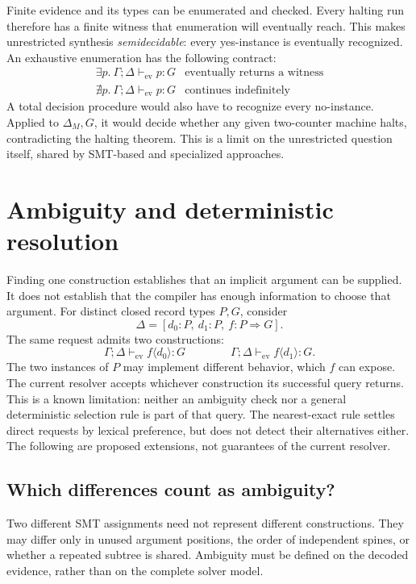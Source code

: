 \documentclass[10pt,a4paper]{article}
\newcommand{\Pj}[2]{\Gamma;\Delta\vdash_{\mathrm{ev}} #1:#2}
\newcommand{\iarg}[1]{\langle#1\rangle}
\begin{document}
Finite evidence and its types can be enumerated and checked. Every halting run
therefore has a finite witness that enumeration will eventually reach. This makes
unrestricted synthesis \emph{semidecidable}: every yes-instance is eventually
recognized. An exhaustive enumeration has the following contract:
\[
\begin{array}{c|c}
 \exists p.\ \Pj p G & \text{eventually returns a witness}\\[3pt]
 \nexists p.\ \Pj p G & \text{continues indefinitely}
\end{array}
\]
A total decision procedure would also have to recognize every no-instance.
Applied to $\Delta_M,G$, it would decide whether any given two-counter machine
halts, contradicting the halting theorem. This is a limit on the unrestricted
question itself, shared by SMT-based and specialized approaches.


\newpage
\section{Ambiguity and deterministic resolution}
\label{sec:ambiguity}
Finding one construction establishes that an implicit argument can be supplied.
It does not establish that the compiler has enough information to choose that
argument. For distinct closed record types $P,G$, consider
\[
 \Delta=[d_0:P,\ d_1:P,\ f:P\Rightarrow G].
\]
The same request admits two constructions:
\[
 \Pj{f\iarg{d_0}}G
 \qquad\qquad
 \Pj{f\iarg{d_1}}G.
\]
The two instances of $P$ may implement different behavior, which $f$ can expose.
The current resolver accepts whichever construction its successful query returns.
This is a known limitation: neither an ambiguity check nor a general deterministic
selection rule is part of that query. The nearest-exact rule settles direct
requests by lexical preference, but does not detect their alternatives either.
The following are proposed extensions, not guarantees of the current resolver.

\subsection{Which differences count as ambiguity?}
Two different SMT assignments need not represent different constructions.
They may differ only in unused argument positions, the order of independent
spines, or whether a repeated subtree is shared. Ambiguity must be defined on
the decoded evidence, rather than on the complete solver model.
\end{document}
